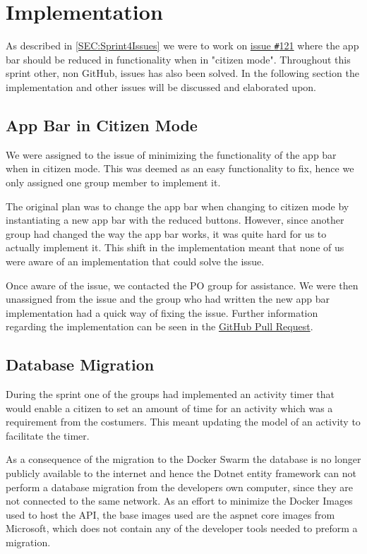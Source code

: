 \section{Implementation}
As described in \autoref{SEC:Sprint4Issues} we were to work on \href{https://github.com/aau-giraf/weekplanner/issues/121}{issue \texttt{\#}121} where the app bar should be reduced in functionality when in "citizen mode". 
Throughout this sprint other, non GitHub, issues has also been solved.
In the following section the implementation and other issues will be discussed and elaborated upon.

\subsection{App Bar in Citizen Mode}
We were assigned to the issue of minimizing the functionality of the app bar when in citizen mode. 
This was deemed as an easy functionality to fix, hence we only assigned one group member to implement it. 

The original plan was to change the app bar when changing to citizen mode by instantiating a new app bar with the reduced buttons. 
However, since another group had changed the way the app bar works, it was quite hard for us to actually implement it.
This shift in the implementation meant that none of us were aware of an implementation that could solve the issue. 

Once aware of the issue, we contacted the PO group for assistance. 
We were then unassigned from the issue and the group who had written the new app bar implementation had a quick way of fixing the issue. 
Further information regarding the implementation can be seen in the \href{https://github.com/aau-giraf/weekplanner/pull/262}{GitHub Pull Request}.

\subsection{Database Migration}
During the sprint one of the groups had implemented an activity timer that would enable a citizen to set an amount of time for an activity which was a requirement from the costumers.
This meant updating the model of an activity to facilitate the timer. 

As a consequence of the migration to the Docker Swarm the database is no longer publicly available to the internet and hence the Dotnet entity framework can not perform a database migration from the developers own computer, since they are not connected to the same network. 
As an effort to minimize the Docker Images used to host the API, the base images used are the aspnet core images from Microsoft, which does not contain any of the developer tools needed to preform a migration. 

